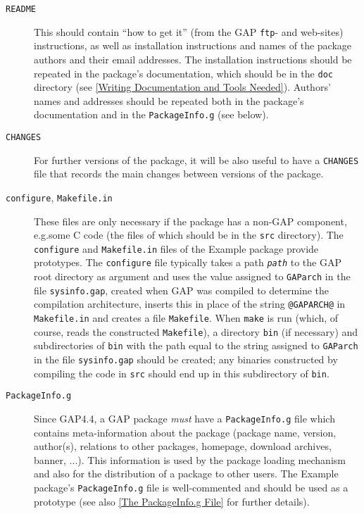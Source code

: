 \documentclass[a4paper,11pt]{report}
\begin{document}
{{ 
\begin{description}
\item[{ \texttt{README}}]   This should contain ``how to get it'' (from the \textsf{GAP} \texttt{ftp}- and web-sites) instructions, as well as installation instructions and names
of the package authors and their email addresses. The installation
instructions should be repeated in the package's documentation, which should
be in the \texttt{doc} directory (see \ref{Writing Documentation and Tools Needed}). Authors' names and addresses should be repeated both in the package's
documentation and in the \texttt{PackageInfo.g} (see below). 
\item[{ \texttt{CHANGES}}]  For further versions of the package, it will be also useful to have a \texttt{CHANGES} file that records the main changes between versions of the package. 
\item[{\texttt{configure}, \texttt{Makefile.in}}]  These files are only necessary if the package has a non-\textsf{GAP} component, e.g.{\nobreakspace}some C code (the files of which should be in the \texttt{src} directory). The \texttt{configure} and \texttt{Makefile.in} files of the \textsf{Example} package provide prototypes. The \texttt{configure} file typically takes a path \mbox{\texttt{\mdseries\slshape path}} to the \textsf{GAP} root directory as argument and uses the value assigned to \texttt{GAParch} in the file \texttt{sysinfo.gap}, created when \textsf{GAP} was compiled to determine the compilation architecture, inserts this in place
of the string \texttt{@GAPARCH@} in \texttt{Makefile.in} and creates a file \texttt{Makefile}. When \texttt{make} is run (which, of course, reads the constructed \texttt{Makefile}), a directory \texttt{bin} (if necessary) and subdirectories of \texttt{bin} with the path equal to the string assigned to \texttt{GAParch} in the file \texttt{sysinfo.gap} should be created; any binaries constructed by compiling the code in \texttt{src} should end up in this subdirectory of \texttt{bin}. 
\item[{\texttt{PackageInfo.g}}]   Since \textsf{GAP}{\nobreakspace}4.4, a \textsf{GAP} package \emph{must} have a \texttt{PackageInfo.g} file which contains meta-information about the package (package name, version,
author(s), relations to other packages, homepage, download archives, banner,
...). This information is used by the package loading mechanism and also for
the distribution of a package to other users. The \textsf{Example} package's \texttt{PackageInfo.g} file is well-commented and should be used as a prototype (see also \ref{The PackageInfo.g File} for further details). 

\end{description}}}
\end{document}
